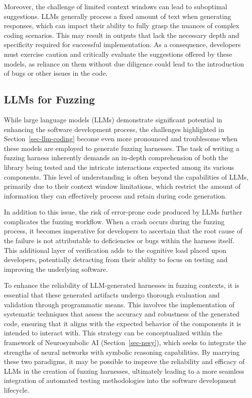 \documentclass[
  a4paper,
]{scrreprt}
\theoremstyle{definition}
\theoremstyle{remark}
\begin{document}
Moreover, the challenge of limited context windows can lead to
suboptimal suggestions. LLMs generally process a fixed amount of text
when generating responses, which can impact their ability to fully grasp
the nuances of complex coding scenarios. This may result in outputs that
lack the necessary depth and specificity required for successful
implementation. As a consequence, developers must exercise caution and
critically evaluate the suggestions offered by these models, as reliance
on them without due diligence could lead to the introduction of bugs or
other issues in the code.

\subsection{LLMs for Fuzzing}\label{llms-for-fuzzing}

While large language models (LLMs) demonstrate significant potential in
enhancing the software development process, the challenges highlighted
in Section~\ref{sec-llm-coding} become even more pronounced and
troublesome when these models are employed to generate fuzzing
harnesses. The task of writing a fuzzing harness inherently demands an
in-depth comprehension of both the library being tested and the
intricate interactions expected among its various components. This level
of understanding is often beyond the capabilities of LLMs, primarily due
to their context window limitations, which restrict the amount of
information they can effectively process and retain during code
generation.

In addition to this issue, the risk of error-prone code produced by LLMs
further complicates the fuzzing workflow. When a crash occurs during the
fuzzing process, it becomes imperative for developers to ascertain that
the root cause of the failure is not attributable to deficiencies or
bugs within the harness itself. This additional layer of verification
adds to the cognitive load placed upon developers, potentially
detracting from their ability to focus on testing and improving the
underlying software.

To enhance the reliability of LLM-generated harnesses in fuzzing
contexts, it is essential that these generated artifacts undergo
thorough evaluation and validation through programmatic means. This
involves the implementation of systematic techniques that assess the
accuracy and robustness of the generated code, ensuring that it aligns
with the expected behavior of the components it is intended to interact
with. This strategy can be conceptualized within the framework of
Neurosymbolic AI (Section~\ref{sec-nesy}), which seeks to integrate the
strengths of neural networks with symbolic reasoning capabilities. By
marrying these two paradigms, it may be possible to improve the
reliability and efficacy of LLMs in the creation of fuzzing harnesses,
ultimately leading to a more seamless integration of automated testing
methodologies into the software development lifecycle.
\end{document}
